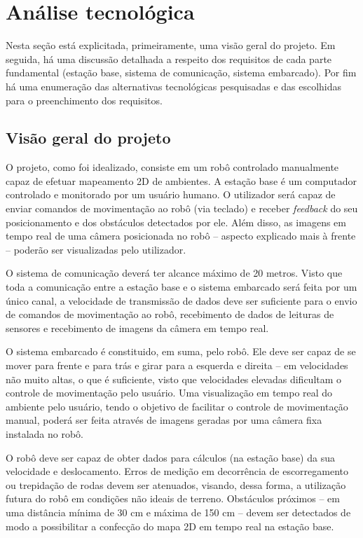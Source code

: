 \chapter{Análise tecnológica}
Nesta seção está explicitada, primeiramente, uma visão geral do projeto. Em seguida, há uma discussão detalhada a respeito dos requisitos de cada parte fundamental (estação base, sistema de comunicação, sistema embarcado). Por fim há uma enumeração das alternativas tecnológicas pesquisadas e das escolhidas para o preenchimento dos requisitos.

\section{Visão geral do projeto}

O projeto, como foi idealizado, consiste em um robô controlado manualmente capaz de efetuar mapeamento 2D de ambientes. A estação base é um computador controlado e monitorado por um usuário humano. O utilizador será capaz de enviar comandos de movimentação ao robô (via teclado) e receber \textit{feedback} do seu posicionamento e dos obstáculos detectados por ele. Além disso, as imagens em tempo real de uma câmera posicionada no robô -- aspecto explicado mais à frente -- poderão ser visualizadas pelo utilizador.

O sistema de comunicação deverá ter alcance máximo de 20 metros. Visto que toda a comunicação entre a estação base e o sistema embarcado será feita por um único canal, a velocidade de transmissão de dados deve ser suficiente para o envio de comandos de movimentação ao robô, recebimento de dados de leituras de sensores e recebimento de imagens da câmera em tempo real.

O sistema embarcado é constituido, em suma, pelo robô. Ele deve ser capaz de se mover para frente e para trás e girar para a esquerda e direita -- em velocidades não muito altas, o que é suficiente, visto que velocidades elevadas dificultam o controle de movimentação pelo usuário. Uma visualização em tempo real do ambiente pelo usuário, tendo o objetivo de facilitar o controle de movimentação manual, poderá ser feita através de imagens geradas por uma câmera fixa instalada no robô. 

O robô deve ser capaz de obter dados para cálculos (na estação base) da sua velocidade e deslocamento. Erros de medição em decorrência de escorregamento ou trepidação de rodas devem ser atenuados, visando, dessa forma, a utilização futura do robô em condições não ideais de terreno. Obstáculos próximos -- em uma distância mínima de 30 cm e máxima de 150 cm -- devem ser detectados de modo a possibilitar a confecção do mapa 2D em tempo real na estação base.



